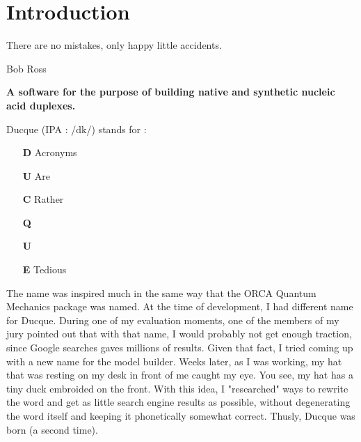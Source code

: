 \pagebreak

\section{Introduction}

\epigraph{There are no mistakes, only happy little accidents.}{Bob Ross}

\begin{center}
    \textbf{A software for the purpose of building native and synthetic nucleic acid duplexes.}
\end{center}

\noindent Ducque \colorbox{gray!20}{(IPA : /dk/)} stands for :
\begin{itemize}[leftmargin=*]
    \setlength{\itemsep}{-1mm}
    \item[\textbf{D}] Acronyms
    \item[\textbf{U}] Are
    \item[\textbf{C}] Rather
    \item[\textbf{Q}]
    \item[\textbf{U}]
    \item[\textbf{E}] Tedious
\end{itemize}
%
%
%
The name was inspired much in the same way that the ORCA Quantum Mechanics package\cite{Neese2020Orca, Neese2022ORCA} was named.
At the time of development, I had different name for Ducque. During one of my evaluation moments, one of the members of my jury pointed out that with that name, I would probably not get enough traction, since Google searches gaves millions of results.
Given that fact, I tried coming up with a new name for the model builder.
Weeks later, as I was working, my hat that was resting on my desk in front of me caught my eye.
You see, my hat has a tiny duck embroided on the front. With this idea, I "researched" ways to rewrite the word and get as little search engine results as possible, without degenerating the word itself and keeping it phonetically somewhat correct. Thusly, Ducque was born (a second time).



